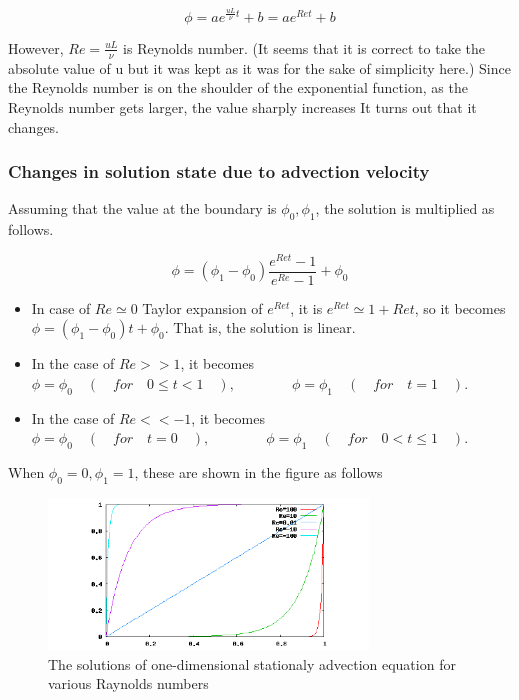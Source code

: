 \begin{equation}
\phi=a e^{\frac{uL}{\nu}t}+b=a e^{Ret}+b
\end{equation}

However, $Re=\frac{uL}{\nu}$ is Reynolds number. (It seems that it is correct to take the absolute value of u but it was kept as it was for the sake of simplicity here.) Since the Reynolds number is on the shoulder of the exponential function, as the Reynolds number gets larger, the value sharply increases It turns out that it changes.

\subsubsection{Changes in solution state due to advection velocity}
Assuming that the value at the boundary is $\phi_0,\phi_1$, the solution is multiplied as follows.

\begin{equation}
\phi=(\phi_1-\phi_0)\frac{e^{Ret}-1}{e^{Re}-1}+\phi_0
\end{equation}

\begin{itemize}
\item In case of $Re\simeq0$ Taylor expansion of $e^{Ret}$, it is $e^{Ret}\simeq 1+Ret$, so it becomes $\phi=(\phi_1-\phi_0)t+\phi_0$. That is, the solution is linear.
\item In the case of $Re>>1$, it becomes $\phi=\phi_0 \quad ( \quad for \quad 0 \le t < 1  \quad ),\qquad\qquad \phi=\phi_1 \quad ( \quad for \quad t=1 \quad ) $.
\item In the case of $Re<<-1$, it becomes $\phi=\phi_0 \quad ( \quad for \quad t=0  \quad ),\qquad\qquad\phi=\phi_1 \quad ( \quad for \quad 0< t\le1 \quad ) $.
\end{itemize}

When $\phi_0=0,\phi_1=1$, these are shown in the figure as follows




\begin{figure}[htbp!]
  \centering
  \includegraphics[width=85mm]{images/advec_1d_reynolds}
  \caption{The solutions of one-dimensional stationaly advection equation for various Raynolds numbers}
  \label{fig:lap_domain}
\end{figure}

